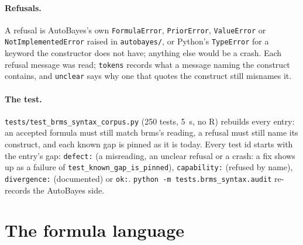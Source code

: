 \documentclass[11pt]{article}
\newcommand{\code}[1]{\texttt{#1}}
\newcommand{\file}[1]{\texttt{#1}}
\begin{document}
\paragraph{Refusals.} A refusal is AutoBayes's own \code{FormulaError}, \code{PriorError}, \code{ValueError} or
\code{NotImplementedError} raised in \file{autobayes/}, or Python's \code{TypeError} for a keyword the constructor does not
have; anything else would be a crash. Each refusal message was read; \code{tokens} records what a message naming the
construct contains, and \code{unclear} says why one that quotes the construct still misnames it.

\paragraph{The test.} \file{tests/test\_brms\_syntax\_corpus.py} (250 tests, 5~s, no R) rebuilds every entry: an accepted
formula must still match brms's reading, a refusal must still name its construct, and each known gap is pinned as it is
today. Every test id starts with the entry's gap: \code{defect:} (a misreading, an unclear refusal or a crash: a fix shows
up as a failure of \code{test\_known\_gap\_is\_pinned}), \code{capability:} (refused by name), \code{divergence:}
(documented) or \code{ok:}. \code{python -m tests.brms\_syntax.audit} re-records the AutoBayes side.

\section{The formula language}\label{sec:formula}
\end{document}
